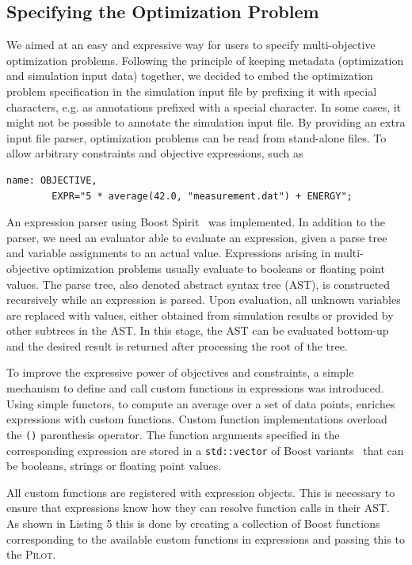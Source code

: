 \documentclass[preprint,linenumbers,amsmath,amssymb,aps,prstab]{revtex4-1}%
\begin{document}
\subsection{Specifying the Optimization Problem}

We aimed at an easy and expressive way for users to specify multi-objective optimization problems.
Following the principle of keeping metadata (optimization and simulation input data) together, 
we decided to embed the optimization problem specification in the simulation input file by 
prefixing it with special characters, e.g. as annotations prefixed with a special character.
In some cases, it might not be possible to annotate the simulation input file.
By providing an extra input file parser, optimization problems can be read from stand-alone files.
To allow arbitrary constraints and objective expressions, such as
%
\begin{Verbatim}[fontsize=\scriptsize]
  name: OBJECTIVE,
        EXPR="5 * average(42.0, "measurement.dat") + ENERGY";
\end{Verbatim}
%
\noindent
An expression parser using Boost Spirit~\cite{boost} was implemented.
In addition to the parser, we need an evaluator able to evaluate an expression,
given a parse tree and variable assignments to an actual value.
Expressions arising in multi-objective optimization problems usually evaluate
to booleans or floating point values.
The parse tree, also denoted abstract syntax tree (AST), is constructed recursively while an expression is parsed.
Upon evaluation, all unknown variables are replaced with values, 
either obtained from simulation results or provided by other subtrees in the AST.
In this stage, the AST can be evaluated bottom-up and the desired result is
  returned after processing the root of the tree.

To improve the expressive power of objectives and constraints, a
  simple mechanism to define and call custom functions in expressions was introduced.
Using simple functors, to compute an
  average over a set of data points, enriches expressions with custom
  functions.
Custom function implementations overload the \texttt{()} parenthesis operator.
The function arguments specified in the corresponding expression are stored in
  a \texttt{std::vector} of Boost variants~\cite{boost2} that can be
  booleans, strings or floating point values.

All custom functions are registered with expression objects.
This is necessary to ensure that expressions know how they can resolve
  function calls in their AST.
As shown in Listing 5 this is done by creating a collection of Boost
  functions~\cite{boost3} corresponding to the
  available custom functions in expressions and passing this to the
  \textsc{Pilot}.
\end{document}
